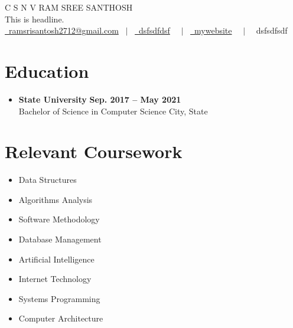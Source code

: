 \documentclass[letterpaper,5pt]{article}
\newcommand{\smalltextbullet}{\,\begin{picture}(-1,1)(-1,-3)\circle*{3}\end{picture}\ }
\begin{document}
    

    
    \begin{center}
        {\Huge \scshape C S N V RAM SREE SANTHOSH} \\ \vspace{1pt}
        \large This is headline. \\ \vspace{1pt}
        \href{mailto:ramsrisantosh2712@gmail.com}{\raisebox{-0.05\height}\faEnvelope \ ramsrisantosh2712@gmail.com} 
        \ $|$ \ \href{tel:dsfsdfdsf}{\raisebox{-0.05\height}\faMobile \ dsfsdfdsf}  \
        \ $|$ \ \href{mywebsite}{\raisebox{-0.05\height}\faGlobe \ mywebsite}  \
        \ $|$ \ {\raisebox{-0.05\height}\faMapMarker \ dsfsdfsdf} \ \  
    \end{center}
    
   \section{\textbf{Education}}
    \begin{itemize}[leftmargin=0in, label={}]
        \item
            \textbf{State University} \hfill \textbf{Sep. 2017 -- May 2021} \\
            Bachelor of Science in Computer Science \hfill City, State
    \end{itemize}
    
    \vspace*{-7mm}
    \section{\textbf{Relevant Coursework}}
    \vspace*{-5mm}
           \begin{multicols}{4}
            \begin{itemize}[ itemsep=-5pt, parsep=3pt]
                \item[\smalltextbullet] Data Structures
                \item[\smalltextbullet] Algorithms Analysis
                \item[\smalltextbullet] Software Methodology
                \item[\smalltextbullet] Database Management
                \item[\smalltextbullet] Artificial Intelligence
                \item[\smalltextbullet] Internet Technology
                \item[\smalltextbullet] Systems Programming
                \item[\smalltextbullet] Computer Architecture
            \end{itemize}
        \end{multicols}  
    
\end{document}
